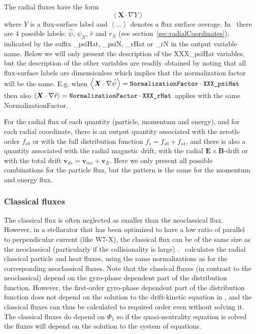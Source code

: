 The radial fluxes have the form 
\[
\left\langle \bm{X} \cdot \nabla Y \right\rangle
\]
where $Y$ is a flux-surface label and $\left< \ldots \right>$ denotes a flux surface average. In \sfincs~there are 4 possible labels: $\hat{\psi}$, $\psi_N$, $\hat{r}$ and $r_N$ (see section~\ref{sec:radialCoordinates}), indicated by the suffix {\ttfamily \_psiHat}, {\ttfamily \_psiN}, {\ttfamily \_rHat} or {\ttfamily \_rN} in the output variable name. 
Below we will only present the description of the {\ttfamily XXX\_psiHat} variables, but the description of the other variables are readily obtained by noting that 
all flux-surface labels are dimensionless which implies that the normalization factor will be the same. E.g. when $\displaystyle \left\langle \bm{X} \cdot \nabla \hat{\psi} \right\rangle = \text{\ttfamily NormalizationFactor} \cdot \text{\ttfamily XXX\_psiHat}$ then also $\displaystyle \left\langle \bm{X} \cdot \nabla \hat{r} \right\rangle = \text{\ttfamily NormalizationFactor} \cdot \text{\ttfamily XXX\_rHat}$ applies with the same {\ttfamily NormalizationFactor}. 

For the radial flux of each quantity (particle, momentum and energy), and for each radial coordinate, there is an output quantity associated with the zeroth-order $f_{s0}$ or with the full distribution function $f_s = f_{s0} + f_{s1}$, and there is also a quantity associated with the radial magnetic drift, with the radial $\bm{E} \times \bm{B}$-drift or with the total drift $\bm{v}_{ds} = \bm{v}_{ms} + \bm{v}_{E}$. Here we only present all possible combinations for the particle flux, but the pattern is the same for the momentum and energy flux. 
%
\subsubsection{Classical fluxes}
%
The classical flux is often neglected as smaller than the neoclassical flux. However, in a stellarator that has been optimized to have a low ratio of parallel to perpendicular current (like W7-X), the classical flux can be of the same size as the neoclassical (particularly if the collisionality is large) \cite{Buller2018}. 
\sfincs~calculates the radial classical particle and heat fluxes, using the same normalizations as for the corresponding neoclassical fluxes. 
Note that the classical fluxes (in contrast to the neoclassical) depend on the gyro-phase dependent part of the distribution function. 
However, the first-order gyro-phase dependent part of the distribution function does not depend on the solution to the drift-kinetic equation in \sfincs, and the classical fluxes can thus be calculated to required order even without solving it. 
The classical fluxes do depend on $\Phi_1$ so if the quasi-neutrality equation is solved the fluxes will depend on the solution to the system of equations. 

